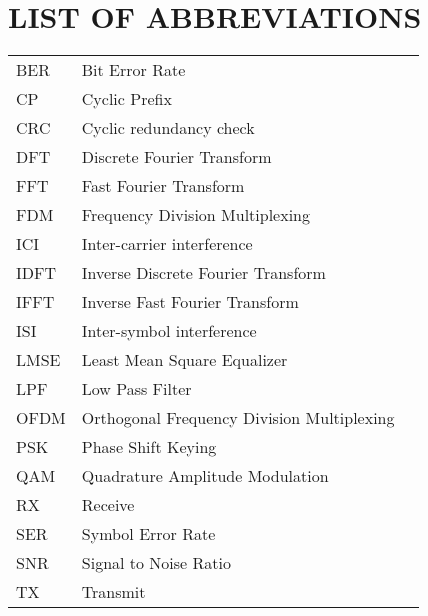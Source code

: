 \section*{LIST OF ABBREVIATIONS}
 {}

\begin{tabularx}{0.9\textwidth}{ L{0.4} L{1.3} L{1.3} }
    BER     & Bit Error Rate \\ %
    CP      & Cyclic Prefix \\ %
    CRC     & Cyclic redundancy check \\
    DFT     & Discrete Fourier Transform \\
    FFT     & Fast Fourier Transform \\
    FDM     & Frequency Division Multiplexing \\ %
    ICI     & Inter-carrier interference \\ %
    IDFT    & Inverse Discrete Fourier Transform \\
    IFFT    & Inverse Fast Fourier Transform \\
    ISI     & Inter-symbol interference \\ %
    LMSE    & Least Mean Square Equalizer \\ %
    LPF     & Low Pass Filter \\
    OFDM    & Orthogonal Frequency Division Multiplexing \\ %
    PSK     & Phase Shift Keying \\ %
    QAM     & Quadrature Amplitude Modulation \\ %
    RX      & Receive \\
    SER     & Symbol Error Rate \\ %
    SNR     & Signal to Noise Ratio \\ %
    TX      & Transmit \\
\end{tabularx}

\newpage